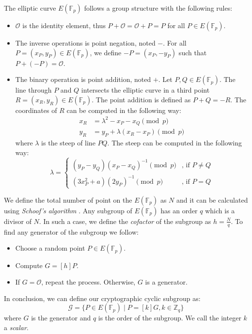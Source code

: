 The elliptic curve $E(\mathbb{F}_p)$ follows a group structure with the following rules:
\begin{itemize}
    \item $\mathcal{O}$ is the identity element, thus \( P + \mathcal{O} = \mathcal{O} + P = P \) for all \( P \in E(\mathbb{F}_p) \).
    \item The inverse operations is point negation, noted $-$. For all \( P = (x_P, y_P) \in E(\mathbb{F}_p) \), we define \( -P = (x_P, -y_P) \) such that \( P + (- P) = \mathcal{O} \).
    \item The binary operation is point addition, noted $+$. Let \( P, Q \in E(\mathbb{F}_p) \). The line through $P$ and $Q$ intersects the elliptic curve in a third point \( R = (x_R, y_R) \in E(\mathbb{F}_p) \). The point addition is defined as \( P + Q = -R \). The coordinates of $R$ can be computed in the following way:
    \begin{align*}
        x_R & = \lambda^2 - x_P - x_Q \pmod{p} \\
        y_R & = y_P + \lambda (x_R - x_P) \pmod p 
    \end{align*}
    where $\lambda$ is the steep of line $PQ$. The steep can be computed in the following way:
    \[ \lambda = 
    \begin{cases}
        (y_P - y_Q)(x_P - x_Q)^{-1} \pmod{p} & \text{, if } P \neq Q \\
        (3x_P^2 + a)(2y_P)^{-1} \pmod{p} & \text{, if } P = Q
    \end{cases}
    \]
\end{itemize}

We define the total number of point on the $E(\mathbb{F}_p)$ as $N$ and it can be calculated using \textit{Schoof's algorithm} \cite{Schoof85}. Any subgroup of $E(\mathbb{F}_p)$ has an order $q$ which is a divisor of $N$. In such a case, we define the \textit{cofactor} of the subgroup as \( h = \frac{N}{q} \). To find any generator of the subgroup we follow:
\begin{itemize}
    \item Choose a random point \( P \in E(\mathbb{F}_p) \).
    \item Compute \( G = [h]P \).
    \item If \( G = \mathcal{O} \), repeat the process. Otherwise, $G$ is a generator.
\end{itemize}

In conclusion, we can define our cryptographic cyclic subgroup as:
\[ \mathcal{G} = \{ P \in E(\mathbb{F}_p) \mid P = [k]G, k \in \mathbb{Z}_q \} \]
where $G$ is the generator and $q$ is the order of the subgroup. We call the integer $k$ a \textit{scalar}.

